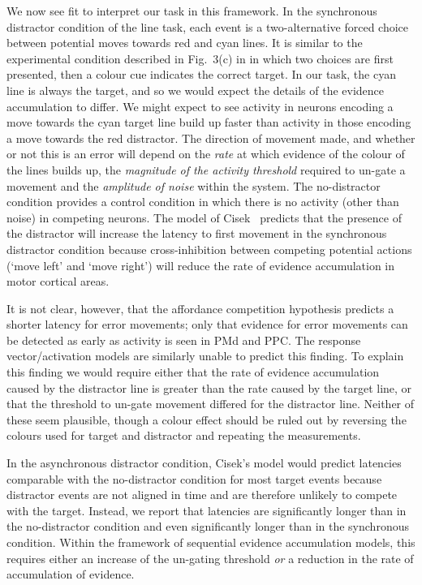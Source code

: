 \documentclass[10pt,letterpaper]{article}
\begin{document}
We now see fit to interpret our task in this framework. In the
synchronous distractor condition of the line task, each event is a
two-alternative forced choice between potential moves towards red and
cyan lines. It is similar to the experimental condition described in
Fig.~3(c) in \cite{cisek_cortical_2007} in which two choices are first
presented, then a colour cue indicates the correct target. In our
task, the cyan line is always the target, and so we would expect the
details of the evidence accumulation to differ.  We might expect to
see activity in neurons encoding a move towards the cyan target line
build up faster than activity in those encoding a move towards the red
distractor. The direction of movement made, and whether or not this is
an error will depend on the \emph{rate} at which evidence of the
colour of the lines builds up, the \emph{magnitude of the activity
  threshold} required to un-gate a movement and the \emph{amplitude of
  noise} within the system. The no-distractor condition provides a
control condition in which there is no activity (other than noise) in
competing neurons. The model of Cisek~\cite{cisek_cortical_2007}
predicts that the presence of the distractor will increase the latency
to first movement in the synchronous distractor condition because
cross-inhibition between competing potential actions (`move left' and
`move right') will reduce the rate of evidence accumulation in motor
cortical areas.

It is not clear, however, that the affordance competition hypothesis
predicts a shorter latency for error movements; only that evidence for
error movements can be detected as early as activity is seen in PMd
and PPC. The response vector/activation models are similarly unable to
predict this finding. To explain this finding we would require either
that the rate of evidence accumulation caused by the distractor line
is greater than the rate caused by the target line, or that the
threshold to un-gate movement differed for the distractor
line. Neither of these seem plausible, though a colour effect should
be ruled out by reversing the colours used for target and distractor
and repeating the measurements.

In the asynchronous distractor condition, Cisek's model would predict
latencies comparable with the no-distractor condition for
most target events because distractor events are not aligned in time
and are therefore unlikely to compete with the target. Instead, we
report that latencies are significantly longer than in the
no-distractor condition and even significantly longer than in the
synchronous condition. Within the framework of sequential evidence
accumulation models, this requires either an increase of the un-gating
threshold \emph{or} a reduction in the rate of accumulation of
evidence.
\end{document}
